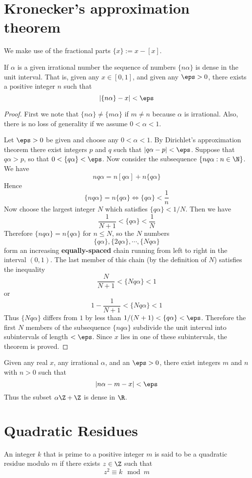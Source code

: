 \section{Kronecker's approximation theorem}
We make use of the fractional parts $\{x\}:=x-[x]$.
\begin{theorem}
If $\alpha$ is a given irrational number the sequence of numbers $\{n\alpha\}$ is dense in the unit interval. That is, given any $x\in[0,1]$, and given any $\eps>0$, there exists a positive integer $n$ such that
\[|\{n\alpha\}-x|<\eps\]
\end{theorem}
\begin{proof}
First we note that $\{n\alpha\}\neq\{m\alpha\}$ if $m\neq n$ because $\alpha$ is irrational. Also, there is no loss of generality if we assume $0<\alpha<1$.\par
Let $\eps>0$ be given and choose any $0<\alpha<1$. By Dirichlet's approximation theorem there exist integers $p$ and $q$ such that $|q\alpha-p|<\eps$. Suppose that $q\alpha>p$, so that $0<\{q\alpha\}<\eps$. Now consider the subsequence $\{nq\alpha:n\in\N\}$. We have
\[nq\alpha=n[q\alpha]+n\{q\alpha\}\]
Hence
\[\{nq\alpha\}=n\{q\alpha\}\iff \{q\alpha\}<\frac{1}{n}\]
Now choose the largest integer $N$ which satisfies $\{q\alpha\}<1/N$. Then we have
\[\frac{1}{N+1}<\{q\alpha\}<\frac{1}{N}\]
Therefore $\{nq\alpha\}=n\{q\alpha\}$ for $n\leq N$, so the $N$ numbers
\[\{q\alpha\},\{2q\alpha\},\cdots,\{Nq\alpha\}\]
form an increasing \textbf{equally-spaced} chain running from left to right in the interval $(0,1)$. The last member of this chain (by the definition of $N$) satisfies the inequality
\[\frac{N}{N+1}<\{Nq\alpha\}<1\]
or
\[1-\frac{1}{N+1}<\{Nq\alpha\}<1\]
Thus $\{Nq\alpha\}$ differs from $1$ by less than $1/(N+1)<\{q\alpha\}<\eps$. Therefore the first $N$ members of the subsequence $\{nq\alpha\}$ subdivide the unit interval into subintervals of length $<\eps$. Since $x$ lies in one of these subintervals, the theorem is proved.
\end{proof}
\begin{corollary}
Given any real $x$, any irrational $\alpha$, and an $\eps>0$, there exist integers $m$ and $n$ with $n>0$ such that
\[|n\alpha-m-x|<\eps\]
Thus the subset $\alpha\Z+\Z$ is dense in $\R$.
\end{corollary}
\section{Quadratic Residues}
An integer $k$ that is prime to a positive integer $m$ is said to be a quadratic residue modulo $m$ if there exists $z\in\Z$ such that
\[z^2\equiv k\mod m\]
